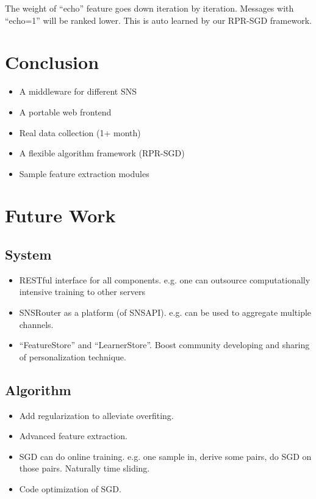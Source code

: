 \documentclass{sig-alternate}
\begin{document}
The weight of ``echo'' feature goes down iteration by iteration. Messages with ``echo=1''
will be ranked lower. This is auto learned by our RPR-SGD framework.

\section{Conclusion}
\label{sec:Conclusion}

\begin{itemize}
	\item A middleware for different SNS
	\item A portable web frontend
	\item Real data collection (1+ month)
	\item A flexible algorithm framework (RPR-SGD)
	\item Sample feature extraction modules
\end{itemize}



\section{Future Work}
\label{sec:Future Work}

\subsection{System}
\label{sec:fu_System}

\begin{itemize}
	\item RESTful interface for all components.
		e.g. one can outsource computationally
		intensive training to other servers
	\item SNSRouter as a platform (of SNSAPI).
		e.g. can be used to aggregate multiple
		channels. 
	\item ``FeatureStore'' and ``LearnerStore''. 
		Boost community developing and sharing of 
		personalization technique. 
\end{itemize}

\subsection{Algorithm}
\label{sec:fu_Algorithm}

\begin{itemize}
	\item Add regularization to alleviate overfiting. 
	\item Advanced feature extraction.
	\item SGD can do online training.
	e.g. one sample in, derive some pairs, do
	SGD on those pairs.
	Naturally time sliding.
	\item Code optimization of SGD. 
\end{itemize}
\end{document}
